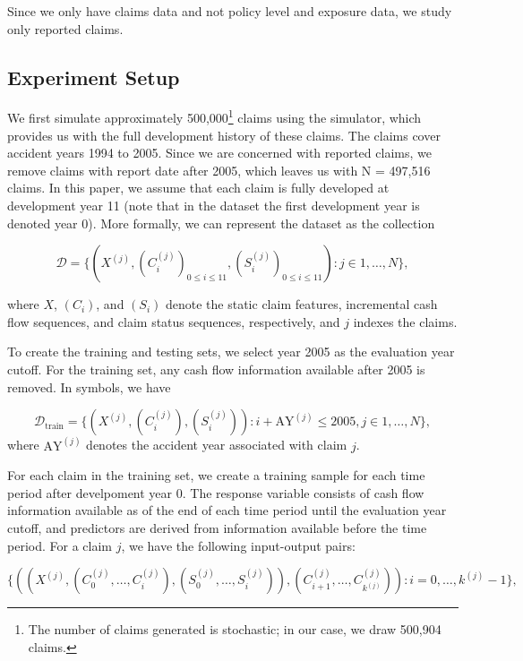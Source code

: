 \documentclass{article}
\begin{document}
Since we only have claims data and not policy level and exposure data, we study only reported claims.

\subsection{Experiment Setup}

We first simulate approximately 500,000\footnote{The number of claims generated is stochastic; in our case, we draw 500,904 claims.} claims using the simulator, which provides us with the full development history of these claims. The claims cover accident years 1994 to 2005. Since we are concerned with reported claims, we remove claims with report date after 2005, which leaves us with N = 497,516 claims. In this paper, we assume that each claim is fully developed at development year 11 (note that in the dataset the first development year is denoted year 0). More formally, we can represent the dataset as the collection

\begin{equation}
    \mathcal{D} = \{ (X^{(j)}, (C_i^{(j)})_{0 \leq i \leq 11}, (S_i^{(j)})_{0 \leq i \leq 11}): j\in {1,\dots, N}\},
\end{equation}

where $X$, $(C_i)$, and $(S_i)$ denote the static claim features, incremental cash flow sequences, and claim status sequences, respectively, and $j$ indexes the claims.

To create the training and testing sets, we select year 2005 as the evaluation year cutoff. For the training set, any cash flow information available after  2005 is removed. In symbols, we have

\begin{equation}
    \mathcal{D}_{\text{train}} = \{ (X^{(j)}, (C_i^{(j)}), (S_i^{(j)})): i + \text{AY}^{(j)} \leq 2005, j \in {1,\dots, N}\},
\end{equation}
where $\text{AY}^{(j)}$ denotes the accident year associated with claim $j$.

For each claim in the training set, we create a training sample for each time period after develpoment year 0. The response variable consists of cash flow information available as of the end of each time period until the evaluation year cutoff, and predictors are derived from information available before the time period. For a claim $j$, we have the following input-output pairs:

\begin{equation}\label{eq:training-samples}
    \{((X^{(j)}, (C_0^{(j)}, \dots, C_i^{(j)}), (S_0^{(j)}, \dots, S_i^{(j)})), (C_{i+1}^{(j)}, \dots, C_{k^{(j)}}^{(j)})): i = 0, \dots, k^{(j)} - 1\},
\end{equation}
\end{document}

